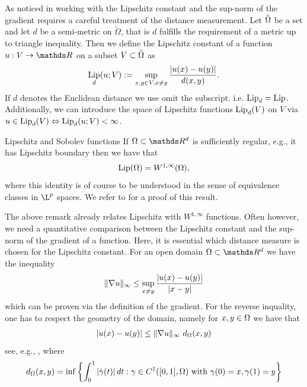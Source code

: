 As noticed in \cite{jensen1993uniqueness} working with the Lipschitz constant and the sup-norm of the gradient requires a careful 
treatment of the distance measurement. Let $\tilde{\Omega}$ be a set and let $d$ be a semi-metric on $\tilde\Omega$, that is $d$ fulfills 
the requirement of a metric up to triangle inequality. Then we define the Lipschitz constant of a function $u:V\to \R$ on a subset $V\subset \tilde{\Omega}$ as
%
\begin{align*}
\operatorname*{Lip}_d(u; V):= \sup_{x,y\in V, x\neq y} \frac{\left|u(x) - u(y)\right|}{d(x,y)}.
\end{align*}
%
If $d$ denotes the Euclidean distance we use omit the subscript. i.e. $\operatorname*{Lip}_d = \operatorname*{Lip}$. Additionally, we can 
introduce the space of Lipschitz functions $\operatorname*{Lip}_d(V)$ on $V$ via 
$u\in \operatorname*{Lip}_d(V) \Leftrightarrow \operatorname*{Lip}_d(u;V) <\infty$.
%
\begin{remark}{Lipschitz and Sobolev functions}{}
If $\domain\subset\R^d$ is sufficiently regular, e.g., it has Lipschitz boundary then we have that
%
\begin{align*}
\operatorname*{Lip}(\Omega) = W^{1,\infty}(\Omega),
\end{align*}
%
where this identity is of course to be understood in the sense of equivalence classes in $\L^p$ spaces. We refer to \cite{evansgariepy} for a proof of this result.
\end{remark}
%
The above remark already relates Lipschitz with $W^{1,\infty}$ functions. Often however, we need a quantitative 
comparison between the Lipschitz constant and the sup-norm of the gradient of a function. Here, it is essential 
which distance measure is chosen for the Lipschitz constant. For an open domain $\domain\subset\R^d$ we have the inequality
%
\begin{align*}
\|\nabla u\|_\infty \leq \sup_{x\neq y} \frac{\left|u(x) - u(y)\right|}{\left|x-y\right|}
\end{align*}
%
which can be proven via the definition of the gradient. For the reverse inquality, one has to respect the 
geometry of the domain, namely for $x,y\in\Omega$ we have that
%
\begin{align}\label{eq:LipGrad}
\left|u(x) - u(y)\right| \leq \|\nabla u\|_\infty\ d_\Omega(x,y)
\end{align}
%
see, e.g., \cite[Prop9.3, Rem. 7]{brezis2011functional}, where
%
\begin{align*}
d_\Omega(x,y) = \inf \left\{
\int_0^1 \left|\dot{\gamma}(t)\right| dt : \gamma\in C^1([0,1], \Omega)\text{ with } \gamma(0)=x, \gamma(1) =y
\right\}
\end{align*}
